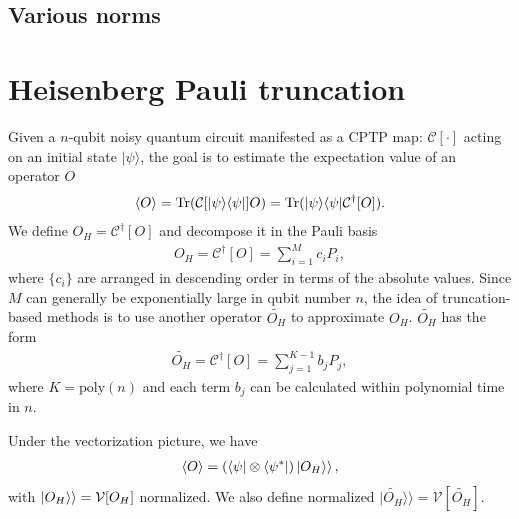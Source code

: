 \documentclass[showpacs,amsmath,amssymb,twocolumn,superscriptaddress,notitlepage,preprintnumbers,aps,pra,10pt,floatfix]{revtex4-2}
\begin{document}
\begin{appendix}
\subsection{Various norms}






\section{Heisenberg Pauli truncation}
Given a $n$-qubit noisy quantum circuit manifested as a CPTP map: $\mathcal{C}[\cdot]$ acting on an initial state $|\psi\rangle$, the goal is to estimate the expectation value of an operator $O$
\begin{eqnarray}
\langle O\rangle=\mathrm{Tr}(\mathcal{C}[|\psi\rangle\langle \psi|]O)=\mathrm{Tr}(|\psi\rangle\langle \psi|\mathcal{C}^\dag[O]).
\end{eqnarray}
We define $O_H=\mathcal{C}^\dag[O]$ and decompose it in the Pauli basis
\begin{eqnarray}
O_H=\mathcal{C}^\dag[O]=\sum_{i=1}^M c_i P_i,
\end{eqnarray}
where $\{c_i\}$ are arranged in descending order in terms of the absolute values. 
Since $M$ can generally be exponentially large in qubit number $n$, the idea of truncation-based methods is to use another operator $\widetilde{O_H}$ to approximate $O_H$.  $\widetilde{O_H}$  has the form
\begin{eqnarray}
\widetilde{O_H}=\mathcal{C}^\dag[O]=\sum_{j=1}^{K-1} b_j P_j,
\end{eqnarray}
where $K = \text{poly}(n)$ and each term $b_j$ can be calculated within polynomial time in $n$.

Under the vectorization picture, we have
\begin{eqnarray}\label{b3}
\langle O\rangle=(\langle \psi|\otimes \langle \psi^*|)\ket{O_H\rangle},
\end{eqnarray}
with $\ket{O_H\rangle}=\mathcal{V}[O_H]$ normalized. We also define normalized $|\widetilde{O_H}\rangle\!\rangle=\mathcal{V}[\widetilde{O_H}]$.


\end{appendix}
\end{document}
